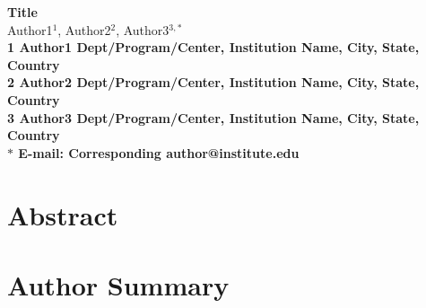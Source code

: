 \documentclass[10pt]{article}
\date{}
\begin{document}
\begin{flushleft}
{\Large
\textbf{Title}
}
\\
Author1$^{1}$, 
Author2$^{2}$, 
Author3$^{3,\ast}$
\\
\bf{1} Author1 Dept/Program/Center, Institution Name, City, State, Country
\\
\bf{2} Author2 Dept/Program/Center, Institution Name, City, State, Country
\\
\bf{3} Author3 Dept/Program/Center, Institution Name, City, State, Country
\\
$\ast$ E-mail: Corresponding author@institute.edu
\end{flushleft}

\section*{Abstract}

\section*{Author Summary}
\end{document}
